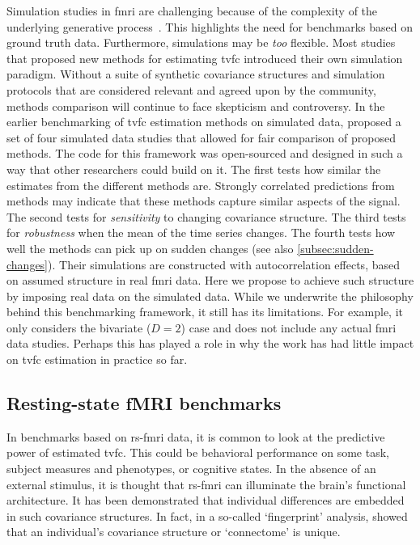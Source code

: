 Simulation studies in \gls{fmri} are challenging because of the complexity of the underlying generative process~\parencite{Welvaert2014}.
This highlights the need for benchmarks based on ground truth data.
%
Furthermore, simulations may be \emph{too} flexible.
Most studies that proposed new methods for estimating \gls{tvfc} introduced their own simulation paradigm.
Without a suite of synthetic covariance structures and simulation protocols that are considered relevant and agreed upon by the community, methods comparison will continue to face skepticism and controversy.
%
In the earlier benchmarking of \gls{tvfc} estimation methods on simulated data, \textcite{Thompson2018} proposed a set of four simulated data studies that allowed for fair comparison of proposed methods.
The code for this framework was open-sourced and designed in such a way that other researchers could build on it.
The first tests how similar the estimates from the different methods are.
Strongly correlated predictions from methods may indicate that these methods capture similar aspects of the signal.
The second tests for \emph{sensitivity} to changing covariance structure.
The third tests for \emph{robustness} when the mean of the time series changes.
The fourth tests how well the methods can pick up on sudden changes (see also \cref{subsec:sudden-changes}).
Their simulations are constructed with autocorrelation effects, based on assumed structure in real \gls{fmri} data.
Here we propose to achieve such structure by imposing real data on the simulated data.
While we underwrite the philosophy behind this benchmarking framework, it still has its limitations.
For example, it only considers the bivariate ($D = 2$) case and does not include any actual \gls{fmri} data studies.
Perhaps this has played a role in why the work has had little impact on \gls{tvfc} estimation in practice so far.

\subsection{Resting-state fMRI benchmarks}

In benchmarks based on \gls{rs-fmri} data, it is common to look at the predictive power of estimated \gls{tvfc}.
This could be behavioral performance on some task, subject measures and phenotypes, or cognitive states.
In the absence of an external stimulus, it is thought that \gls{rs-fmri} can illuminate the brain's functional architecture.
It has been demonstrated that individual differences are embedded in such covariance structures.
In fact, in a so-called `fingerprint' analysis, \textcite{Finn2015} showed that an individual's covariance structure or `connectome' is unique.

